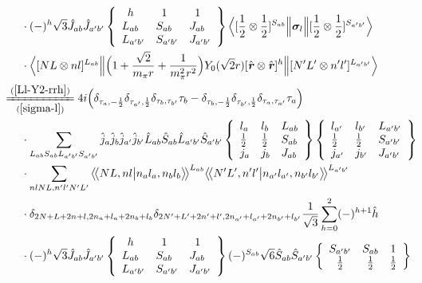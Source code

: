 \documentclass[master]{shnuthesis}
\newcommand{\llangle}{\big\langle\!\big\langle}
\newcommand{\rrangle}{\big\rangle\!\big\rangle}
\newcommand{\bmr}{\textbf{\textit{r}}}
\newcommand{\ap}{a^\prime}
\newcommand{\bp}{b^\prime}
\newcommand{\il}{\!\!\!\!\!\!\!\!\!\!}
\newcommand{\zdydh}{\xlongequal}
\begin{document}
$$\begin{align}
    & \cdot (-)^{h}\sqrt{3}\hat{J}_{ab}\hat{J}_{\ap\bp}  \left\{\begin{array}{lll} \,\,\,h & \,\,\,1 & \,\,\,1 \\ L_{ab} & S_{ab} & J_{ab} \\ L_{\ap\bp} & S_{\ap\bp} & J_{\ap\bp} \end{array}\right\}  \Big\langle [\frac{1}{2}\otimes\frac{1}{2}]^{S_{ab}} \Big\| \bm{\sigma}_l \Big\| [\frac{1}{2}\otimes\frac{1}{2}]^{S_{\ap\bp}} \Big\rangle  \notag\\
    & \cdot \Big\langle [N L \otimes n l]^{L_{ab}} \Big\| \Big(1+\frac{\sqrt{2}}{m_\pi r}+\frac{1}{m_\pi^2 r^2}\Big) Y_0(\sqrt{2}r) [\hat{\bmr} \otimes \hat{\bmr}]^h \Big\| [N^\prime L^\prime \otimes n^\prime l^\prime]^{L_{\ap\bp}} \Big\rangle \\
    &\il \zdydh[(\ref{sigma-l})]{(\ref{Ll-Y2-rrh})} 4i \Big( \delta_{\tau_a,-\frac{1}{2}}\delta_{\tau_{\ap},\frac{1}{2}}\delta_{\tau_b,\tau_{\bp}}\tau_b - \delta_{\tau_b,-\frac{1}{2}}\delta_{\tau_{\bp},\frac{1}{2}}\delta_{\tau_a,\tau_{\ap}}\tau_a \Big) \notag\\
    & \cdot \sum_{L_{ab}S_{ab}L_{\ap\bp}S_{\ap\bp}} \hat{j}_a\hat{j}_b\hat{j}_{\ap}\hat{j}_{\bp}\hat{L}_{ab}\hat{S}_{ab}\hat{L}_{\ap\bp}\hat{S}_{\ap\bp}  \left\{\begin{array}{lll}l_{a} & l_{b} & L_{ab} \\ \frac{1}{2} & \frac{1}{2} & S_{ab} \\j_{a} & j_{b} & J_{ab} \end{array}\right\} \left\{\begin{array}{lll}l_{\ap} & l_{\bp} & L_{\ap\bp} \\ \frac{1}{2} & \frac{1}{2} & S_{\ap\bp} \\j_{\ap} & j_{\bp} & J_{\ap\bp} \end{array}\right\}  \notag \\
    & \cdot \sum_{nlNL,n^\prime l^\prime N^\prime L^\prime} \llangle N L, n l \big| n_{a} l_{a}, n_{b} l_{b} \rrangle^{L_{ab}} \llangle N^\prime L^\prime, n^\prime l^\prime \big| n_{a^\prime} l_{a^\prime}, n_{b^\prime} l_{b^\prime} \rrangle^{L_{\ap\bp}} \notag\\
    & \cdot \delta_{2N+L+2n+l,2n_a+l_a+2n_b+l_b}\delta_{2N^\prime+L^\prime+2n^\prime+l^\prime,2n_{a^\prime}+l_{a^\prime}+2n_{b^\prime}+l_{b^\prime}} \frac{1}{\sqrt{3}} \sum_{h=0}^{2} (-)^{h+1}\hat{h}  \notag\\
    & \cdot (-)^{h}\sqrt{3}\hat{J}_{ab}\hat{J}_{\ap\bp}  \left\{\begin{array}{lll} \,\,\,h & \,\,\,1 & \,\,\,1 \\ L_{ab} & S_{ab} & J_{ab} \\ L_{\ap\bp} & S_{\ap\bp} & J_{\ap\bp} \end{array}\right\}  (-)^{S_{ab}}\sqrt{6}\hat{S}_{ab}\hat{S}_{\ap\bp}  \left\{\begin{array}{ccc} S_{\ap\bp} & S_{ab} & 1 \\ \frac{1}{2} & \frac{1}{2} & \frac{1}{2} \end{array}\right\}  \notag\\

\end{align}$$
\end{document}
